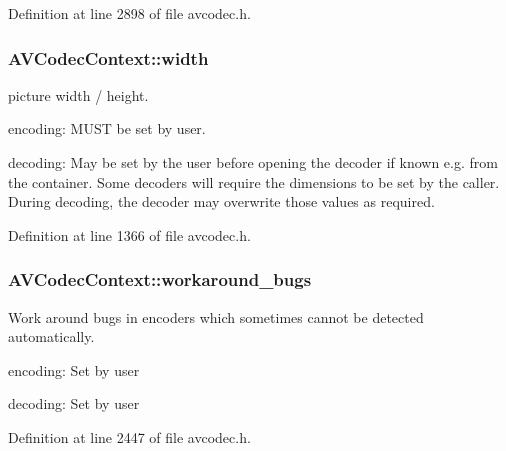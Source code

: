 Definition at line 2898 of file avcodec.\+h.

\subsubsection[{\texorpdfstring{width}{width}}]{ A\+V\+Codec\+Context\+::width}\hypertarget{struct_a_v_codec_context_a0d8f46461754e8abea0847dcbc41b956}{}\label{struct_a_v_codec_context_a0d8f46461754e8abea0847dcbc41b956}
picture width / height.
\begin{DoxyItemize}
\item encoding\+: M\+U\+ST be set by user.
\item decoding\+: May be set by the user before opening the decoder if known e.\+g. from the container. Some decoders will require the dimensions to be set by the caller. During decoding, the decoder may overwrite those values as required. 
\end{DoxyItemize}

Definition at line 1366 of file avcodec.\+h.

\subsubsection[{\texorpdfstring{workaround\+\_\+bugs}{workaround_bugs}}]{ A\+V\+Codec\+Context\+::workaround\+\_\+bugs}\hypertarget{struct_a_v_codec_context_a4649a6454a0f784794b89afdc44da669}{}\label{struct_a_v_codec_context_a4649a6454a0f784794b89afdc44da669}
Work around bugs in encoders which sometimes cannot be detected automatically.
\begin{DoxyItemize}
\item encoding\+: Set by user
\item decoding\+: Set by user 
\end{DoxyItemize}

Definition at line 2447 of file avcodec.\+h.

